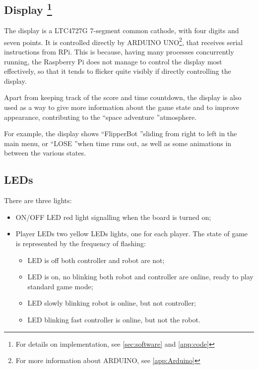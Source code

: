 \documentclass[a4paper,twoside]{book}
\begin{document}
\subsection[Display]{Display \footnote{For details on implementation, see \autoref{sec:software} and \autoref{app:code}}}

The display is a LTC4727G 7-segment common cathode, with four digits and seven points. It is controlled directly by ARDUINO UNO\footnote{For more information about ARDUINO, see \autoref{app:Arduino}}, that receives serial instructions from RPi. This is because, having many processes concurrently running, the Raspberry Pi does not manage to control the display most effectively, so that it tends to flicker quite visibly if directly controlling the display.

Apart from keeping track of the score and time countdown, the display is also used as a way to give more information about the game state and to improve appearance, contributing to the \textquotedblleft space adventure \textquotedblright atmosphere.

For example, the display shows \textquotedblleft FlipperBot \textquotedblright sliding from right to left in the main menu, or \textquotedblleft LOSE \textquotedblright when time runs out, as well as some animations in between the various states.


\subsection{LEDs}

There are three lights:
\begin{itemize}
\item ON/OFF LED \textemdash red light signalling when the board is turned on;
\item Player LEDs \textemdash two yellow LEDs lights, one for each player. The state of game is represented by the frequency of flashing:
	\begin{itemize}
	\item LED is off \textemdash both controller and robot are not;
	\item LED is on, no blinking \textemdash both robot and controller are online, ready to play standard game mode;
	\item LED slowly blinking \textemdash robot is online, but not controller;
	\item LED blinking fast \textemdash controller is online, but not the robot.
	\end{itemize}
\end{itemize}
\end{document}
